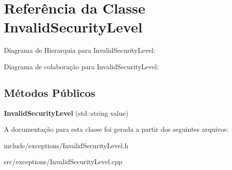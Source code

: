 \hypertarget{classInvalidSecurityLevel}{}\section{Referência da Classe Invalid\+Security\+Level}
\label{classInvalidSecurityLevel}


Diagrama de Hierarquia para Invalid\+Security\+Level\+:


Diagrama de colaboração para Invalid\+Security\+Level\+:
\subsection*{Métodos Públicos}
\begin{DoxyCompactItemize}
\item 
\mbox{\label{classInvalidSecurityLevel_a1758cd0851c4ad1c06caef5cbcc5b131}} 
{\bfseries Invalid\+Security\+Level} (std\+::string value)
\end{DoxyCompactItemize}


A documentação para esta classe foi gerada a partir dos seguintes arquivos\+:\begin{DoxyCompactItemize}
\item 
include/exceptions/Invalid\+Security\+Level.\+h\item 
src/exceptions/Invalid\+Security\+Level.\+cpp\end{DoxyCompactItemize}
